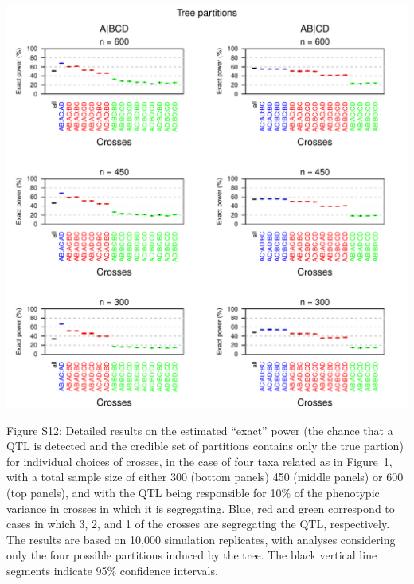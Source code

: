\documentclass[letterpaper,twoside]{article}
\begin{document}
\newpage

{\centering
\includegraphics{SuppFigs/detailedexpower_treepart.pdf}}

\bigskip \noindent
Figure S12: Detailed results on the estimated ``exact'' power (the chance that a QTL is detected and the
credible set of partitions contains only the true partion) for individual
  choices of crosses, in the case of four taxa related as in Figure~1,
  with a total sample size of either 300 (bottom panels) 450 (middle
  panels) or 600 (top panels), and with the QTL being responsible
  for 10\% of the phenotypic variance in crosses in which it is
  segregating. Blue, red and green correspond to cases in which 3, 2,
  and 1 of the crosses are segregating the QTL, respectively.  The
  results are based on 10,000 simulation replicates, with analyses
  considering only the four possible partitions induced by the tree.
  The black vertical line segments indicate 95\% confidence intervals.

\newpage
\end{document}
